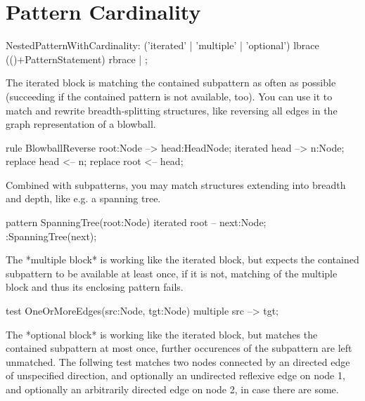   
\section{Pattern Cardinality}
\label{pc}

\begin{rail}  
  NestedPatternWithCardinality: 
    ('iterated' | 'multiple' | 'optional') lbrace (()+PatternStatement) rbrace |
    ;
\end{rail}

The iterated block is matching the contained subpattern as often as possible
(succeeding if the contained pattern is not available, too).
You can use it to match and rewrite breadth-splitting structures,
like reversing all edges in the graph representation of a blowball.

\begin{example}
  \begin{grgen}
rule BlowballReverse {
  root:Node --> head:HeadNode;
  iterated {
    head --> n:Node;
	replace {
	  head <-- n;
	}
  }
  replace { 
    root <-- head;
  }
}
  \end{grgen}
\end{example}

Combined with subpatterns, you may match structures extending into breadth and depth,
like e.g. a spanning tree.

\begin{example}
  \begin{grgen}
pattern SpanningTree(root:Node)
{
  iterated {
    root -- next:Node;
    :SpanningTree(next);
  }
}
  \end{grgen}
\end{example}

The *multiple block* is working like the iterated block, 
but expects the contained subpattern to be available at least once,
if it is not, matching of the multiple block and thus its enclosing pattern fails.

\begin{example}
  \begin{grgen}
test OneOrMoreEdges(src:Node, tgt:Node)
{
  multiple {
    src --> tgt;
  }
}
  \end{grgen}
\end{example}

The *optional block* is working like the iterated block,
but matches the contained subpattern at most once, 
further occurences of the subpattern are left unmatched.
The follwing test matches two nodes connected by an directed edge
of unspecified direction, and optionally an undirected reflexive edge
on node 1, and optionally an arbitrarily directed edge on node 2,
in case there are some.

